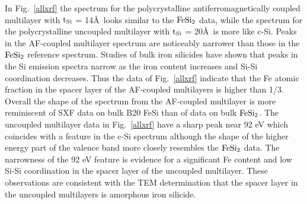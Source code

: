 In Fig.~\ref{allxrf} the spectrum for the polycrystalline
antiferromagnetically coupled multilayer with $\rm t_{Si}$ = 14\AA\
looks similar to the $\rm FeSi_2$ data, while the spectrum for the
polycrystalline uncoupled multilayer with $\rm t_{Si}$ = 20\AA\ is
more like c-Si.  Peaks in the AF-coupled multilayer spectrum are
noticeably narrower than those in the $\rm FeSi_2$ reference spectrum.
Studies of bulk iron silicides have shown that peaks in the Si
emission spectra narrow as the iron content increases and Si-Si
coordination decreases.\cite{jia} Thus the data of Fig.~\ref{allxrf}
indicate that the Fe atomic fraction in the spacer layer of the
AF-coupled multilayers is higher than 1/3.  Overall the shape of the
spectrum from the AF-coupled multilayer is more reminiscent of SXF
data on bulk B20 FeSi than of data on bulk $\rm FeSi_2$.\cite{jia} The
uncoupled multilayer data in Fig.~\ref{allxrf} have a sharp peak near
92 eV which coincides with a feature in the c-Si spectrum although the
shape of the higher energy part of the valence band more closely
resembles the $\rm FeSi_2$ data.  The narrowness of the 92 eV feature
is evidence for a significant Fe content and low Si-Si coordination in
the spacer layer of the uncoupled multilayer.  These observations are
consistent with the TEM determination that the spacer layer in the
uncoupled multilayers is amorphous iron silicide.\cite{fesiprb}


